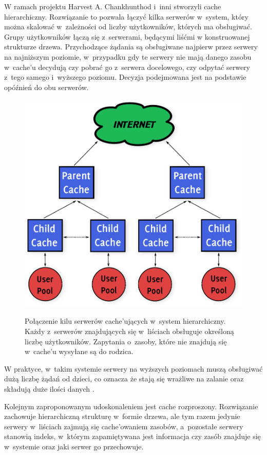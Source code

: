 \documentclass[a4paper,11pt]{scrartcl}
\newcommand{\s}{ }
\newcommand{\kesz}{cache}
\newcommand{\keszu}{cache'u}
\newcommand{\keszujacych}{cache'ujących}
\newcommand{\keszowaniem}{cache'owaniem}
\begin{document}
W ramach projektu Harvest \cite{bowman1994harvest} A. Chankhunthod i~inni \cite{chankhunthod1995hierarchical} stworzyli \kesz\s hierarchiczny. Rozwiązanie to pozwala łączyć kilka serwerów w~system, który można skalować w~zależności od liczby użytkowników, których ma obsługiwać. Grupy użytkowników łączą się z~serwerami, będącymi liśćmi w konstruowanej strukturze drzewa. Przychodzące żądania są obsługiwane najpierw przez serwery na najniższym poziomie, w~przypadku gdy te serwery nie mają danego zasobu w~\keszu\s decydują czy pobrać go z~serwera docelowego, czy odpytać serwery z~tego samego i~wyższego poziomu. Decyzja podejmowana jest na podstawie opóźnień do obu serwerów.

\begin{figure}[h]
\centering
\includegraphics[width=0.8\linewidth]{img/hierarchical.pdf}
\label{fig_cache_hierarchical}
\caption{Połączenie kilu serwerów \keszujacych\s w~system hierarchiczny. Każdy z~serwerów znajdujących się w~liściach obsługuje określoną liczbę użytkowników. Zapytania o~zasoby, które nie znajdują się w~\keszu\s wysyłane są do rodzica.}
\end{figure}

W praktyce, w~takim systemie serwery na wyższych poziomach muszą obsługiwać dużą liczbę żądań od dzieci, co oznacza że stają się wrażliwe na zalanie oraz składują duże ilości danych \cite{povey1997distributed}.

Kolejnym zaproponowanym udoskonaleniem jest \kesz\s rozproszony. Rozwiązanie zachowuje hierarchiczną strukturę w~formie drzewa, ale tym razem jedynie serwery w~liściach zajmują się \keszowaniem\s zasobów, a~pozostałe serwery stanowią indeks, w~którym zapamiętywana jest informacja czy zasób znajduje się w~systemie oraz jaki serwer go przechowuje.
\end{document}

